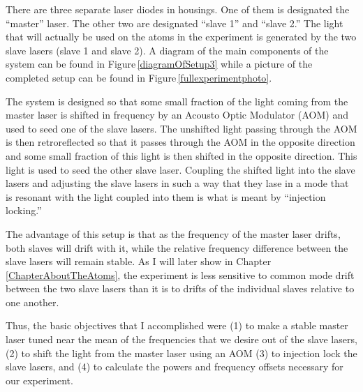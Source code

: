 There are three separate laser diodes in housings. One of them is designated the ``master'' laser. The other two are designated ``slave 1'' and ``slave 2.'' The light that will actually be used on the atoms in the experiment is generated by the two slave lasers (slave 1 and slave 2).
 A diagram of the main components of the system can be found in Figure\,\ref{diagramOfSetup3} while a picture of the completed setup can be found in Figure\,\ref{fullexperimentphoto}. 

The system is designed so that some small fraction of the light coming from the master laser is shifted in frequency by an Acousto Optic Modulator (AOM) and used to seed one of the slave lasers. The unshifted light passing through the AOM is then retroreflected so that it passes through the AOM in the opposite direction and some small fraction of this light is then shifted in the opposite direction. This light is used to seed the other slave laser. Coupling the shifted light into the slave lasers and adjusting the slave lasers in such a way that they lase in a mode that is resonant with the light coupled into them is what is meant by ``injection locking.'' 

The advantage of this setup is that as the frequency of the master laser drifts, both slaves will drift with it, while the relative frequency difference between the slave lasers will remain stable.  As I will later show in Chapter \ref{ChapterAboutTheAtoms}, the experiment is less sensitive to common mode drift between the two slave lasers than it is to drifts of the individual slaves relative to one another. 


Thus, the basic objectives that I accomplished were (1) to make a stable master laser tuned near the mean of the frequencies that we desire out of the slave lasers, (2) to shift the light from the master laser using an AOM (3) to injection lock the slave lasers, and (4) to calculate the powers and frequency offsets necessary for our experiment.

